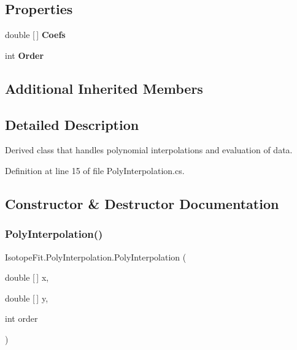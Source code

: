 \subsection*{Properties}
\begin{DoxyCompactItemize}
\item 
\mbox{\label{class_isotope_fit_1_1_poly_interpolation_a15443a5303b14cf3a4257209c356d5d8}} 
double \mbox{[}$\,$\mbox{]} {\bfseries Coefs}
\item 
\mbox{\label{class_isotope_fit_1_1_poly_interpolation_a9145d70d1259efee946f5deed75666d8}} 
int {\bfseries Order}
\end{DoxyCompactItemize}
\subsection*{Additional Inherited Members}


\subsection{Detailed Description}
Derived class that handles polynomial interpolations and evaluation of data. 



Definition at line 15 of file Poly\+Interpolation.\+cs.



\subsection{Constructor \& Destructor Documentation}
\mbox{\label{class_isotope_fit_1_1_poly_interpolation_a0ad4d407eb80baf6c38b3b752048e285}} 
\subsubsection{\texorpdfstring{Poly\+Interpolation()}{PolyInterpolation()}\hspace{0.1cm}{\footnotesize\ttfamily [1/2]}}
{\footnotesize\ttfamily Isotope\+Fit.\+Poly\+Interpolation.\+Poly\+Interpolation (\begin{DoxyParamCaption}\item[{double \mbox{[}$\,$\mbox{]}}]{x,  }\item[{double \mbox{[}$\,$\mbox{]}}]{y,  }\item[{int}]{order }\end{DoxyParamCaption})}



